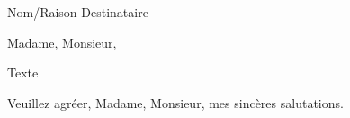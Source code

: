 \documentclass[a4paper,10pt]{lettre}
\makeatletter
\newcommand*{\NoRule}{\renewcommand*{\rule@length}{0}}
\makeatother
\begin{document}

\begin{letter}{Nom/Raison Destinataire} %
\NoRule

\openingspace=0pt
\sigspace=0pt

\marge{0mm}

\makeatletter
		\def\pict@let@width{185}       %
		\def\pict@let@height{65}       %
		\def\pict@let@hoffset{0}       %
		\def\pict@let@voffset{0}       %
		\def\rule@length{0}           %
		\def\fromaddress@let@hpos{0} %
		\def\fromaddress@let@vpos{70}  %
		\fromaddress@let@width=50mm    %
		\def\fromlieu@let@hpos{117}     %
		\def\fromlieu@let@vpos{15}      %
		\fromlieu@let@width=50mm       %
		\def\toaddress@let@hpos{95}    %
		\def\toaddress@let@vpos{45}    %
		\toaddress@let@width=65mm      %
\makeatother

\address{Prénom Nom\\
42 rue Louise Michel\\
13012 Marseille}
\nofax

\renewcommand{\tellabelname}{}
\renewcommand{\emaillabelname}{}


\def\concname{Objet :~} %

\opening{Madame, Monsieur,}

Texte

\closing{Veuillez agréer, Madame, Monsieur, mes sincères salutations.}

\end{letter}
\end{document}
